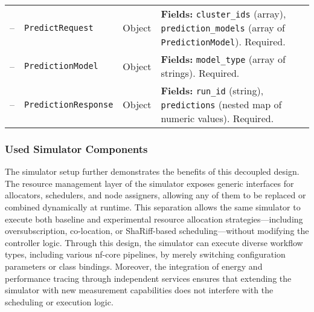 \begin{table}[H]
{\begin{tabular}{
            p{0.8cm}
            p{5.3cm}
            >{\centering\arraybackslash}p{2cm}
            p{9cm}
            }
            --          & \texttt{PredictRequest}         & Object          &
            \textbf{Fields:} \texttt{cluster\_ids} (array), \texttt{prediction\_models} (array of \texttt{PredictionModel}). Required. \\

            --          & \texttt{PredictionModel}        & Object          &
            \textbf{Fields:} \texttt{model\_type} (array of strings). Required.                                                        \\

            --          & \texttt{PredictionResponse}     & Object          &
            \textbf{Fields:} \texttt{run\_id} (string), \texttt{predictions} (nested map of numeric values). Required.                 \\


            \bottomrule
        \end{tabular}
    }
\end{table}

\subsubsection{Used Simulator Components}
\label{sec:simulator_setup}
The simulator setup further demonstrates the benefits of this decoupled design. The resource management layer of the simulator exposes generic interfaces for allocators, schedulers, and node assigners, allowing any of them to be replaced or combined dynamically at runtime. This separation allows the same simulator to execute both baseline and experimental resource allocation strategies—including oversubscription, co-location, or ShaRiff-based scheduling—without modifying the controller logic. Through this design, the simulator can execute diverse workflow types, including various nf-core pipelines, by merely switching configuration parameters or class bindings. Moreover, the integration of energy and performance tracing through independent services ensures that extending the simulator with new measurement capabilities does not interfere with the scheduling or execution logic.


